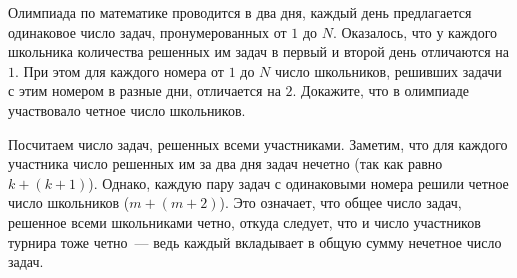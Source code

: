 Олимпиада по математике проводится в два дня, каждый день предлагается
одинаковое число задач, пронумерованных от $1$ до $N$.
Оказалось, что у каждого школьника количества решенных им задач в первый и
второй день отличаются на $1$.
При этом для каждого номера от $1$ до $N$ число школьников, решивших задачи с
этим номером в разные дни, отличается на $2$.
Докажите, что в олимпиаде участвовало четное число школьников.

\solution
Посчитаем число задач, решенных всеми участниками.
Заметим, что для каждого участника число решенных им за два дня задач нечетно
(так как равно $k + (k + 1)$).
Однако, каждую пару задач с одинаковыми номера решили четное число школьников
($m + (m + 2)$).
Это означает, что общее число задач, решенное всеми школьниками четно, откуда
следует, что и число участников турнира тоже четно~--- ведь каждый вкладывает
в общую сумму нечетное число задач.

